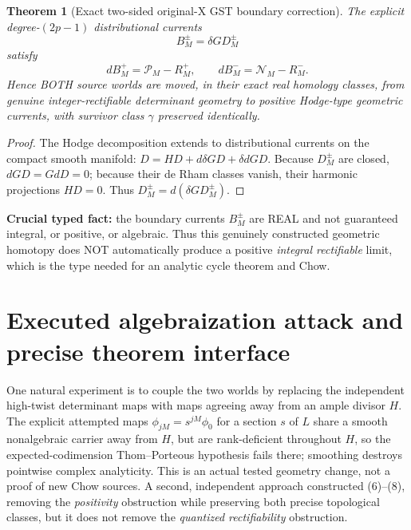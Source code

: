\documentclass[11pt]{article}
\newtheorem{theorem}{Theorem}[section]
\begin{document}
\begin{theorem}[Exact two-sided original-X GST boundary correction]
The explicit degree-\((2p-1)\) distributional currents
\[
\boxed{B_M^\pm=\delta G D_M^\pm}
\]
satisfy
\[
\boxed{dB_M^+=\mathcal P_M-R_M^+,\qquad
dB_M^-=\mathcal N_M-R_M^-.}                                \tag{8}
\]
Hence BOTH source worlds are moved, in their exact real homology classes, from genuine integer-rectifiable determinant geometry to positive Hodge-type geometric currents, with survivor class \(\gamma\) preserved identically.
\end{theorem}
\begin{proof}
The Hodge decomposition extends to distributional currents on the compact smooth manifold:
\(D=H D+d\delta GD+\delta dGD\).
Because \(D_M^\pm\) are closed, \(dGD=GdD=0\); because their de Rham classes vanish, their harmonic projections \(HD=0\). Thus \(D_M^\pm=d(\delta GD_M^\pm)\).
\end{proof}

\noindent\textbf{Crucial typed fact:} the boundary currents \(B_M^\pm\) are REAL and not guaranteed integral, or positive, or algebraic. Thus this genuinely constructed geometric homotopy does NOT automatically produce a positive \emph{integral rectifiable} limit, which is the type needed for an analytic cycle theorem and Chow.

\section{Executed algebraization attack and precise theorem interface}
One natural experiment is to couple the two worlds by replacing the independent high-twist determinant maps with maps agreeing away from an ample divisor \(H\). The explicit attempted maps \(\phi_{jM}=s^{jM}\phi_0\) for a section \(s\) of \(L\) share a smooth nonalgebraic carrier away from \(H\), but are rank-deficient throughout \(H\), so the expected-codimension Thom--Porteous hypothesis fails there; smoothing destroys pointwise complex analyticity. This is an actual tested geometry change, not a proof of new Chow sources. A second, independent approach constructed (6)--(8), removing the \emph{positivity} obstruction while preserving both precise topological classes, but it does not remove the \emph{quantized rectifiability} obstruction.
\end{document}

